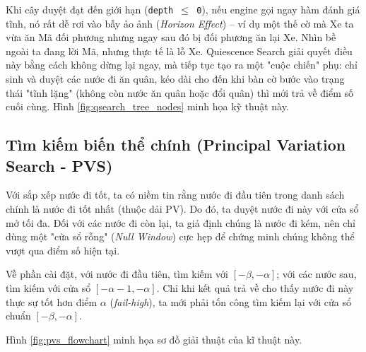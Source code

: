 Khi cây duyệt đạt đến giới hạn (\texttt{depth $\le$ 0}), nếu engine gọi ngay hàm đánh giá tĩnh, nó rất dễ rơi vào bẫy ảo ảnh (\textit{Horizon Effect}) – ví dụ một thế cờ mà Xe ta vừa ăn Mã đối phương nhưng ngay sau đó bị đối phương ăn lại Xe. Nhìn bề ngoài ta đang lời Mã, nhưng thực tế là lỗ Xe. Quiescence Search giải quyết điều này bằng cách không dừng lại ngay, mà tiếp tục tạo ra một "cuộc chiến" phụ: chỉ sinh và duyệt các nước đi ăn quân, kéo dài cho đến khi bàn cờ bước vào trạng thái "tĩnh lặng" (không còn nước ăn quân hoặc đổi quân) thì mới trả về điểm số cuối cùng. Hình \ref{fig:qsearch_tree_nodes} minh họa kỹ thuật này.

\subsection{Tìm kiếm biến thể chính (Principal Variation Search - PVS)}

Với sắp xếp nước đi tốt, ta có niềm tin rằng nước đi đầu tiên trong danh sách chính là nước đi tốt nhất (thuộc dải PV). Do đó, ta duyệt nước đi này với cửa sổ mở tối đa. Đối với các nước đi còn lại, ta giả định chúng là nước đi kém, nên chỉ dùng một "cửa sổ rỗng" (\textit{Null Window}) cực hẹp để chứng minh chúng không thể vượt qua điểm số hiện tại.

Về phần cài đặt, với nước đi đầu tiên, tìm kiếm với $[-\beta, -\alpha]$; với các nước sau, tìm kiếm với cửa sổ $[-\alpha - 1, -\alpha]$. Chỉ khi kết quả trả về cho thấy nước đi này thực sự tốt hơn điểm $\alpha$ (\textit{fail-high}), ta mới phải tốn công tìm kiếm lại với cửa sổ chuẩn $[-\beta, -\alpha]$.

Hình \ref{fig:pvs_flowchart} minh họa sơ đồ giải thuật của kĩ thuật này.

